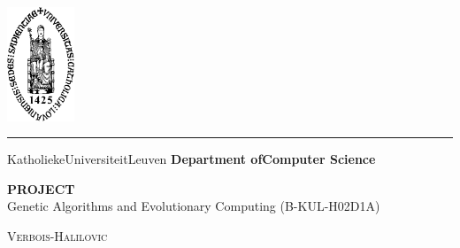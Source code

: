 \documentclass{report}
\begin{document}
\lstset{language=Prolog}          %

\begin{titlepage}
	\newpage
	\thispagestyle{empty}
	\frenchspacing
	\hspace{-0.2cm}
	\includegraphics[height=3.4cm]{sedes}
	\hspace{0.2cm}
	\rule{0.5pt}{3.4cm}
	\hspace{0.2cm}
	\begin{minipage}[b]{8cm}
		\Large{Katholieke\newline Universiteit\newline Leuven}\smallskip\newline
		\large{}\smallskip\newline
		\textbf{Department of\newline Computer Science}\smallskip
	\end{minipage}
	\vspace*{3.2cm}\vfill
	\begin{center}
		\begin{minipage}[t]{\textwidth}
			\begin{center}
				\LARGE{\rm{\textbf{\uppercase{Project}}}}\\
				\Large{\rm{Genetic Algorithms and Evolutionary Computing (B-KUL-H02D1A) }}\\
				\vspace{0.5cm}

			    \large{\textsc{Verbois-Halilovic}}%

			\end{center}
		\end{minipage}
	\end{center}
	\vfill
	\hfill{}
\end{titlepage}
\end{document}
